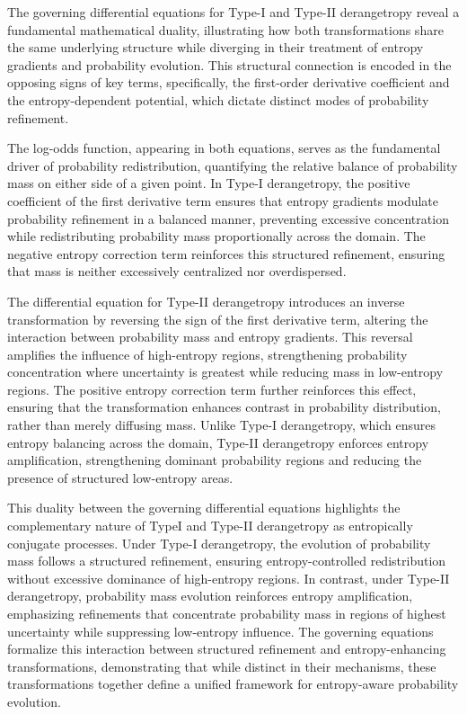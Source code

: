 \documentclass[sn-mathphys-num]{sn-jnl}%
\theoremstyle{thmstyleone}%
\theoremstyle{thmstyletwo}%
\theoremstyle{thmstylethree}%
\begin{document}
The governing differential equations for Type-I and Type-II derangetropy reveal a fundamental mathematical duality, illustrating how both transformations share the same underlying structure while diverging in their treatment of entropy gradients and probability evolution. This structural connection is encoded in the opposing signs of key terms, specifically, the first-order derivative coefficient and the entropy-dependent potential, which dictate distinct modes of probability refinement.

The log-odds function, appearing in both equations, serves as the fundamental driver of probability redistribution, quantifying the relative balance of probability mass on either side of a given point. In Type-I derangetropy, the positive coefficient of the first derivative term ensures that entropy gradients modulate probability refinement in a balanced manner, preventing excessive concentration while redistributing probability mass proportionally across the domain. The negative entropy correction term reinforces this structured refinement, ensuring that mass is neither excessively centralized nor overdispersed.

The differential equation for Type-II derangetropy introduces an inverse transformation by reversing the sign of the first derivative term, altering the interaction between probability mass and entropy gradients. This reversal amplifies the influence of high-entropy regions, strengthening probability concentration where uncertainty is greatest while reducing mass in low-entropy regions. The positive entropy correction term further reinforces this effect, ensuring that the transformation enhances contrast in probability distribution, rather than merely diffusing mass. Unlike Type-I derangetropy, which ensures entropy balancing across the domain, Type-II derangetropy enforces entropy amplification, strengthening dominant probability regions and reducing the presence of structured low-entropy areas.

This duality between the governing differential equations highlights the complementary nature of TypeI and Type-II derangetropy as entropically conjugate processes. Under Type-I derangetropy, the evolution of probability mass follows a structured refinement, ensuring entropy-controlled redistribution without excessive dominance of high-entropy regions. In contrast, under Type-II derangetropy, probability mass evolution reinforces entropy amplification, emphasizing refinements that concentrate probability mass in regions of highest uncertainty while suppressing low-entropy influence. The governing equations formalize this interaction between structured refinement and entropy-enhancing transformations, demonstrating that while distinct in their mechanisms, these transformations together define a unified framework for entropy-aware probability evolution.
\end{document}
